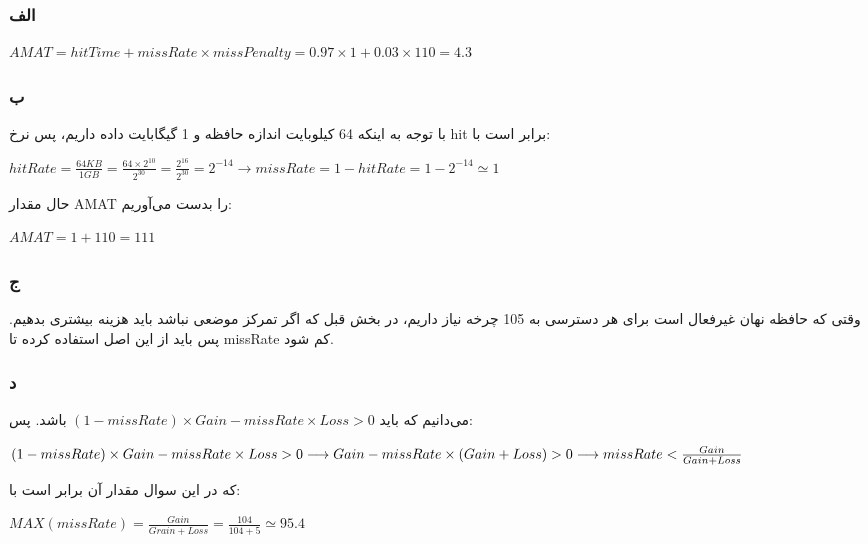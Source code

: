 \subsubsection*{الف}

\setLTR
$
AMAT = hitTime + missRate \times missPenalty =0.97 \times 1 + 0.03 \times 110 = 4.3
$
\setRTL

\subsubsection*{ب}
با توجه به اینکه 64 کیلوبایت اندازه حافظه و 1 گیگابایت داده داریم، پس نرخ hit برابر است با:

\setLTR
$
hitRate = \frac{64KB}{1GB} = \frac{64\times2^10}{2^{30}} = \frac{2^{16}}{2^{30}} = 2^{-14} \longrightarrow missRate = 1-hitRate = 1-2^{-14} \simeq 1
$
\setRTL

حال مقدار AMAT را بدست می‌آوریم:

\setLTR
$
AMAT = 1 + 110 = 111
$
\setRTL
\subsubsection*{ج}
وقتی که حافظه نهان غیرفعال است برای هر دسترسی به 105 چرخه نیاز داریم، در بخش قبل که اگر تمرکز موضعی نباشد باید هزینه بیشتری بدهیم. پس باید از این اصل استفاده کرده تا missRate کم شود.



\subsubsection*{د}

می‌دانیم که باید 
$(1-missRate)\times Gain - missRate \times Loss > 0$
باشد. پس:

\setLTR
$
(1-missRate)\times Gain - missRate \times Loss > 0 \longrightarrow Gain - missRate\times(Gain + Loss) > 0 \\ \longrightarrow missRate 	< \frac{Gain}{Gain + Loss} 
$
\setRTL

که در این سوال مقدار آن برابر است با:

\setLTR
$
MAX(missRate) = \frac{Gain}{Grain + Loss} = \frac{104}{104 + 5}\simeq 95.4
$
\setRTL